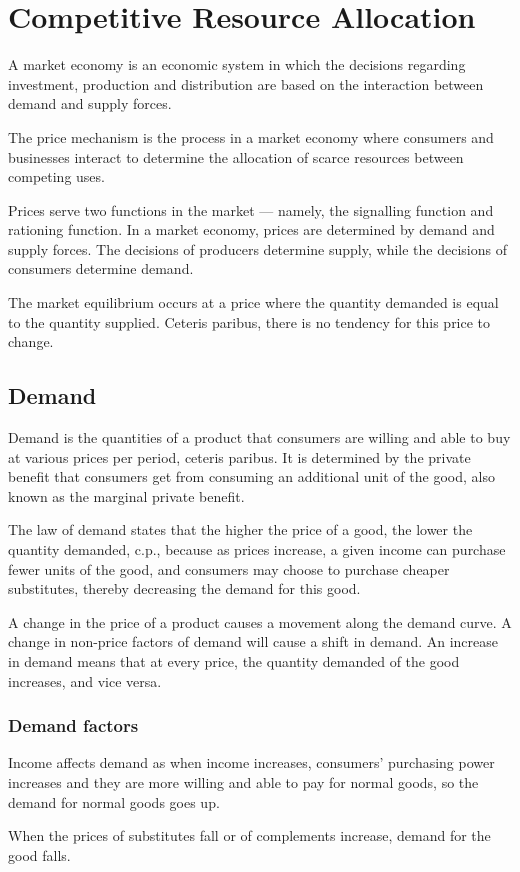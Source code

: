 \documentclass[Economics.tex]{subfiles}
\begin{document}
\chapter{Competitive Resource Allocation}
A market economy is an economic system in which the decisions regarding investment, production and distribution are based on the interaction between demand and supply forces.

The price mechanism is the process in a market economy where consumers and businesses interact to determine the allocation of scarce resources between competing uses.

Prices serve two functions in the market --- namely, the signalling function and rationing function. In a market economy, prices are determined by demand and supply forces. The decisions of producers determine supply, while the decisions of consumers determine demand.

The market equilibrium occurs at a price where the quantity demanded is equal to the quantity supplied. Ceteris paribus, there is no tendency for this price to change.
\section{Demand}
Demand is the quantities of a product that consumers are willing and able to buy at various prices per period, ceteris paribus. It is determined by the private benefit that consumers get from consuming an additional unit of the good, also known as the marginal private benefit.

The law of demand states that the higher the price of a good, the lower the quantity demanded, c.p., because as prices increase, a given income can purchase fewer units of the good, and consumers may choose to purchase cheaper substitutes, thereby decreasing the demand for this good.

A change in the price of a product causes a movement along the demand curve. A change in non-price factors of demand will cause a shift in demand. An increase in demand means that at every price, the quantity demanded of the good increases, and vice versa.
\subsection{Demand factors}
Income affects demand as when income increases, consumers' purchasing power increases and they are more willing and able to pay for normal goods, so the demand for normal goods goes up.

When the prices of substitutes fall or of complements increase, demand for the good falls.
\end{document}
